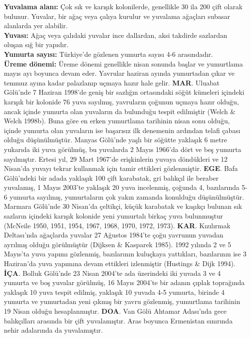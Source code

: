 \documentclass[
  letterpaper,
  DIV=11,
  numbers=noendperiod]{scrreprt}
\begin{document}
\textbf{Yuvalama alanı:} Çok sık ve karışık kolonilerde, genellikle 30
ila 200 çift olarak bulunur. Yuvalar, bir ağaç veya çalıya kurulur ve
yuvalama ağaçları subasar alanlarda yer alabilir.\\
\textbf{Yuvası:} Ağaç veya çalıdaki yuvalar ince dallardan, aksi
takdirde sazlardan oluşan sığ bir yapıdır.\\
\textbf{Yumurta sayısı:} Türkiye'de gözlenen yumurta sayısı 4-6
arasındadır.\\
\textbf{Üreme dönemi:} Üreme dönemi genellikle nisan sonunda başlar ve
yumurtlama mayıs ayı boyunca devam eder. Yavrular haziran ayında
yumurtadan çıkar ve temmuz ayına kadar palazlanıp uçmaya hazır hale
gelir. \textbf{MAR}. Uluabat Gölü'nde 7 Haziran 1998'de geniş bir
sazlığın ortasındaki söğüt kümeleri içindeki karışık bir kolonide 76
yuva sayılmış, yavruların çoğunun uçmaya hazır olduğu, ancak içinde
yumurta olan yuvaların da bulunduğu tespit edilmiştir (Welch \& Welch
1998b). Buna göre en erken yumurtlama tarihinin nisan sonu olduğu,
içinde yumurta olan yuvaların ise başarısız ilk denemenin ardından
telafi çabası olduğu düşünülmüştür. Manyas Gölü'nde yaşlı bir söğütte
yaklaşık 6 metre yukarıda iki yuva görülmüş, bu yuvalarda 2 Mayıs
1966'da dört ve beş yumurta sayılmıştır. Ertesi yıl, 29 Mart 1967'de
erişkinlerin yuvaya döndükleri ve 12 Nisan'da yuvayı tekrar kullanmak
için tamir ettikleri gözlenmiştir. \textbf{EGE}. Bafa Gölü'ndeki bir
adada yaklaşık 100 çift karabatak, gri balıkçıl ile beraber yuvalamış, 1
Mayıs 2003'te yaklaşık 20 yuva incelenmiş, çoğunda 4, bazılarında 5-6
yumurta sayılmış, yumurtaların çok yakın zamanda konulduğu
düşünülmüştür. Marmara Gölü'nde 30 Nisan'da çeltikçi, küçük karabatak ve
kaşıkçı bulunan sık sazların içindeki karışık kolonide yeni yumurtalı
birkaç yuva bulunmuştur (McNeile 1950, 1951, 1954, 1967, 1968, 1970,
1972, 1973). \textbf{KAR}. Kızılırmak Deltası'nda ağaçlarda yuvalar 27
Ağustos 1984'te çoğu yavrunun yuvadan ayrılmış olduğu görülmüştür
(Dijksen \& Kasparek 1985). 1992 yılında 2 ve 5 Mayıs'ta yuva yapımı
gözlenmiş, bazılarının kuluçkaya yattıkları, bazılarının ise 3
Haziran'da yuva yapımına devam ettikleri izlenmiştir (Hustings \& Dijk
1994). \textbf{İÇA}. Bolluk Gölü'nde 23 Nisan 2004'te ada üzerindeki iki
yuvada 3 ve 4 yumurta ve boş yuvalar görülmüş, 16 Mayıs 2004'te bir
adanın çıplak toprağında yaklaşık 10 yuva tespit edilmiş, yaklaşık 10
yuvada 4-5 yumurta, birinde 4 yumurta ve yumurtadan yeni çıkmış bir
yavru gözlenmiş, yumurtlama tarihinin 19 Nisan olduğu hesaplanmıştır.
\textbf{DOA}. Van Gölü Ahtamar Adası'nda gece balıkçılları arasında bir
çift yuvalamıştır. Aras boyunca Ermenistan sınırında nehir adalarında da
yuvalamıştır.
\end{document}
